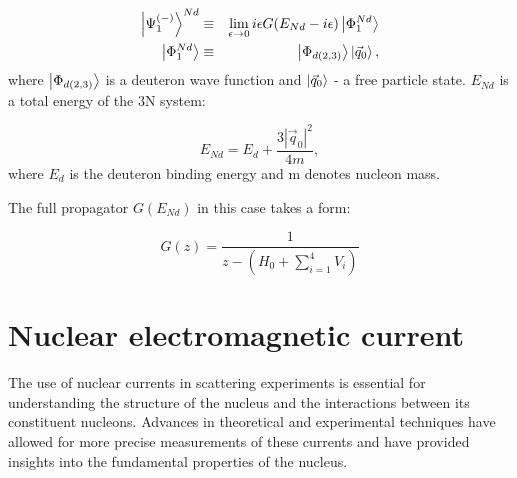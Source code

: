     \begin{eqnarray}
        \ket{\Psi^{(-)}_1}^{Nd} &\equiv& \lim_{\epsilon \rightarrow 0} 
        i \epsilon G(E_{Nd} - i\epsilon)\ket{\Phi^{Nd}_1}\\
        \ket{\Phi^{Nd}_1} &\equiv& \ket{\Phi_{d(2,3)}}\ket{\vec{q}_0},
    \end{eqnarray}
    where $\ket{\Phi_{d(2,3)}}$ is a deuteron wave function and 
    $\ket{\vec{q}_0}$ - a free particle state. $E_{Nd}$
    is a total energy of the 3N system:

    \begin{equation}
        E_{Nd} = E_d + \frac{3 |\vec{q}_0|^2}{4m},
    \end{equation}
    where $E_d$ is the deuteron binding energy and m denotes nucleon mass. 

    The full propagator $G(E_{Nd})$ in this case takes a form:
    
    \begin{equation}
        G(z)= \frac{1}{z - (H_0 + \sum_{i=1}^4V_i)}
    \end{equation}


    \section{Nuclear electromagnetic current}
    
    The use of nuclear currents in scattering experiments is essential for understanding the structure of the nucleus and the interactions between its constituent nucleons. Advances in theoretical and experimental techniques have allowed for more precise measurements of these currents and have provided insights into the fundamental properties of the nucleus.


